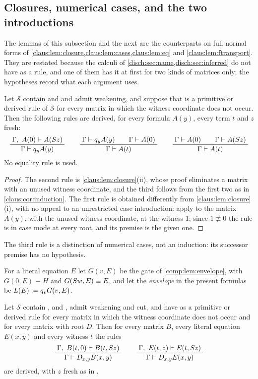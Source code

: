 \subsection{Closures, numerical cases, and the two introductions}

The lemmas of this subsection and the next are the counterparts on full
normal forms of \cref{claus:lem:closure,claus:lem:cases,claus:lem:eq} and
\cref{claus:lem:ftransport}. They are restated because the calculi of
\cref{disch:sec:name,disch:sec:inferred} do not have  as a
rule, and one of them has it at first for two kinds of matrices only; the
hypotheses record what each argument uses.

\begin{lemma}
\label{disch:lem:closure}
Let $\mathcal S$ contain  and  and admit
weakening, and suppose that  is a primitive or derived rule
of $\mathcal S$ for every matrix in which the witness coordinate does not
occur. Then the following rules are derived, for every formula $A(y)$,
every term $t$ and $z$ fresh:
\[
 \dfrac{\;\Gamma,\ A(0)\vdash A(S z)\;}{\;\Gamma\vdash q_yA(y)\;}
 \qquad
 \dfrac{\;\Gamma\vdash q_yA(y)\qquad\Gamma\vdash A(0)\;}{\;\Gamma\vdash A(t)\;}
 \qquad
 \dfrac{\;\Gamma\vdash A(0)\qquad\Gamma\vdash A(S z)\;}{\;\Gamma\vdash A(t)\;}
\]
No equality rule is used.
\end{lemma}

\begin{proof}
The second rule is \cref{claus:lem:closure}(ii), whose proof eliminates a
matrix with an unused witness coordinate, and the third follows from the
first two as in \cref{claus:cor:induction}. The first rule is obtained
differently from \cref{claus:lem:closure}(i), with no appeal to an
unrestricted case introduction: apply  to the matrix
$A(y)$, with the unused witness coordinate, at the witness $1$; since
$1\not\equiv 0$ the rule is in case mode at every root, and its premise is
the given one.
\end{proof}

The third rule is a distinction of numerical cases, not an induction: its
successor premise has no hypothesis.

For a literal equation $E$ let $G(v,E)$ be the gate of
\cref{comp:lem:envelope}, with $G(0,E)\equiv H$ and
$G(S w,E)\equiv E$, and let the \emph{envelope} in the present
formulas be $L(E)\mathrel{:=} q_vG(v,E)$.

\begin{lemma}
\label{disch:lem:repair}
Let $\mathcal S$ contain ,  and
, admit weakening and cut, and have  as a
primitive or derived rule for every matrix in which the witness coordinate
does not occur and for every matrix with root $D$. Then for every matrix
$B$, every literal equation $E(x,y)$ and every witness $t$ the rules
\[
 \dfrac{\;\Gamma,\ B(t,0)\vdash B(t,S z)\;}{\;\Gamma\vdash D_{x,y}B(x,y)\;}
 \qquad
 \dfrac{\;\Gamma,\ E(t,z)\vdash E(t,S z)\;}{\;\Gamma\vdash D_{x,y}E(x,y)\;}
\]
are derived, with $z$ fresh as in .
\end{lemma}


